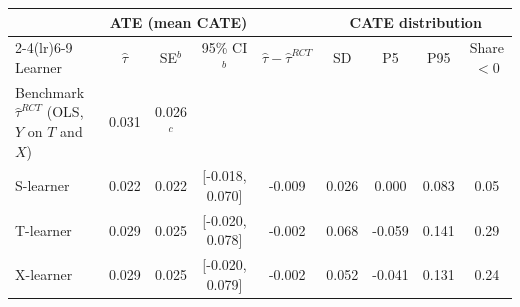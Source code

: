 \begin{tabular}{lcccccccc}
\toprule
 & \multicolumn{3}{c}{ATE (mean CATE)} & & \multicolumn{4}{c}{CATE distribution}\\
\cmidrule(lr){2-4}\cmidrule(lr){6-9}
Learner & $\hat\tau$ & SE$^b$ & 95\% CI$^b$ & $\hat\tau-\hat\tau^{RCT}$ & SD & P5 & P95 & Share $<0$\\
\midrule
Benchmark $\hat\tau^{RCT}$ (OLS, $Y$ on $T$ and $X$) & 0.031 & 0.026$^c$ & & & & & & \\
\addlinespace
S-learner & 0.022 & 0.022 & [-0.018, 0.070] & -0.009 & 0.026 & 0.000 & 0.083 & 0.05\\
T-learner & 0.029 & 0.025 & [-0.020, 0.078] & -0.002 & 0.068 & -0.059 & 0.141 & 0.29\\
X-learner & 0.029 & 0.025 & [-0.020, 0.079] & -0.002 & 0.052 & -0.041 & 0.131 & 0.24\\
\bottomrule
\end{tabular}

